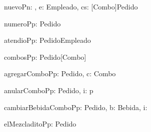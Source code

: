 
\begin{problema}{nuevoP}{n: \ent, e: Empleado, cs: [Combo]}{Pedido}
\end{problema}

\begin{problema}{numeroP}{p: Pedido}{\ent}
\end{problema}

\begin{problema}{atendioP}{p: Pedido}{Empleado}
\end{problema}

\begin{problema}{combosP}{p: Pedido}{[Combo]}
\end{problema}

\begin{problema}{agregarComboP}{p: Pedido, c: Combo}{}
\end{problema}

\begin{problema}{anularComboP}{p: Pedido, i:\ent}{}
	\modifica p
	\asegura{combos(p) = [combos(pre(p))_{j}\ |\ \forall j \selec [0..|combos(pre(p))|), j \neq i]}
\end{problema}

\begin{problema}{cambiarBebidaComboP}{p: Pedido, b: Bebida, i:\ent} {}
\end{problema}

\begin{problema}{elMezcladitoP}{p: Pedido}{}
\end{problema}
